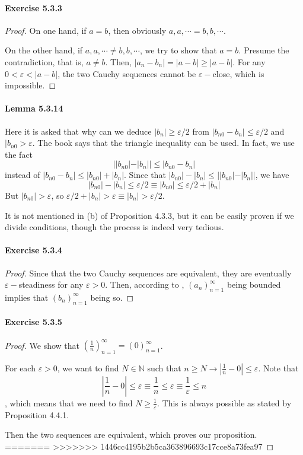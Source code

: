 \paragraph{Exercise 5.3.3} \label{exercise5.3.3}
\begin{proof}
On one hand, if $a=b$, then obviously $a,a,\cdots = b,b,\cdots$.

On the other hand, if $a,a,\cdots \neq b,b,\cdots$, we try to show that $a=b$. Presume the contradiction, that is,
$a \neq b$. Then, $|a_n-b_n| = |a-b| \geq |a-b|$. For any $0<\varepsilon< |a-b|$, the two Cauchy sequences cannot be
$\varepsilon-$close, which is impossible.
\end{proof}

\paragraph{Lemma 5.3.14}
Here it is asked that why can we deduce $|b_n| \geq \varepsilon/2$ from $|b_{n0} - b_n| \leq \varepsilon/2$ and
$|b_{n0} > \varepsilon$. The book says that the triangle inequality can be used. In fact, we use the fact
\[
||b_{n0}| - |b_n|| \leq |b_{n0} - b_n|
\]
instead of $|b_{n0} - b_n| \leq |b_{n0}| + |b_n|$. Since that $|b_{n0}| - |b_n| \leq ||b_{n0}| - |b_n||$,
we have
\[
|b_{n0}| - |b_n| \leq \varepsilon/2 \equiv |b_{n0}| \leq \varepsilon/2 + |b_n|
\]
But $|b_{n0}| > \varepsilon$, so $\varepsilon/2 + |b_n| > \varepsilon \equiv |b_n| > \varepsilon/2$.

It is not mentioned in (b) of Proposition 4.3.3, but it can be easily proven if we divide conditions, though
the process is indeed very tedious.

\paragraph{Exercise 5.3.4} \label{exercise5.3.4}
\begin{proof}
Since that the two Cauchy sequences are equivalent, they are eventually $\varepsilon-$steadiness for any $\varepsilon>0$.
Then, according to , $(a_n)^\infty_{n=1}$ being bounded implies that $(b_n)^\infty_{n=1}$ being so.
\end{proof}

\paragraph{Exercise 5.3.5} \label{exercise5.3.5}
\begin{proof}
We show that $(\frac{1}{n})^\infty_{n=1} = (0)^\infty_{n=1}$.

For each $\varepsilon>0$, we want to find $N \in \mathbb{N}$ such that
$n\geq N \longrightarrow |\frac{1}{n}-0|\leq \varepsilon$. Note that
\[
|\frac{1}{n}-0|\leq \varepsilon \equiv \frac{1}{n} \leq \varepsilon \equiv \frac{1}{\varepsilon} \leq n
\],
which means that we need to find $N \geq \frac{1}{\varepsilon}$. This is always possible as stated by Proposition 4.4.1.

Then the two sequences are equivalent, which proves our proposition.
=======
>>>>>>> 1446cc4195b2b5ca363896693c17cce8a73fea97
\end{proof}
